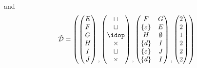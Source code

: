 and
\[
    \spec{D} = \left(
        \begin{pmatrix}
            E\\
            F\\
            G\\
            H\\
            I\\
            J
        \end{pmatrix}
        \begin{matrix}\\\\\\\\\\,\end{matrix}
        \begin{pmatrix}
            \sqcup\\
            \sqcup\\
            \idop\\
            \times\\
            \sqcup\\
            \times
        \end{pmatrix}
        \begin{matrix}\\\\\\\\\\,\end{matrix}
        \begin{pmatrix}
            F & G\\
            \set{\varepsilon} & E\\
            H & \emptyset\\
            \set{d} & I\\
            \set{\varepsilon} & J\\
            \set{d} & I
        \end{pmatrix}
        \begin{matrix}\\\\\\\\\\,\end{matrix}
        \begin{pmatrix}
            2\\
            2\\
            1\\
            2\\
            2\\
            2
        \end{pmatrix}
    \right)
\]
